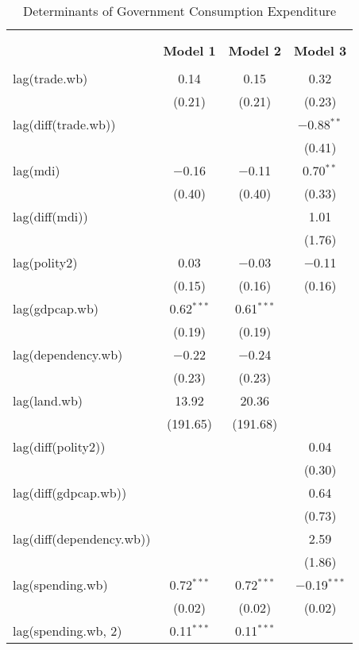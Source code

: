 
\begin{table}[!htbp] \centering 
  \caption{Determinants of Government Consumption Expenditure} 
  \label{} 
\footnotesize 
\begin{tabular}{@{\extracolsep{5pt}}lccc} 
\\[-1.8ex]\hline \\[-1.8ex] 
\\[-1.8ex] & \textbf{Model 1} & \textbf{Model 2} & \textbf{Model 3}\\ 
\hline \\[-1.8ex] 
 lag(trade.wb) & 0.14 & 0.15 & 0.32 \\ 
  & (0.21) & (0.21) & (0.23) \\ 
  lag(diff(trade.wb)) &  &  & $-$0.88$^{**}$ \\ 
  &  &  & (0.41) \\ 
  lag(mdi) & $-$0.16 & $-$0.11 & 0.70$^{**}$ \\ 
  & (0.40) & (0.40) & (0.33) \\ 
  lag(diff(mdi)) &  &  & 1.01 \\ 
  &  &  & (1.76) \\ 
  lag(polity2) & 0.03 & $-$0.03 & $-$0.11 \\ 
  & (0.15) & (0.16) & (0.16) \\ 
  lag(gdpcap.wb) & 0.62$^{***}$ & 0.61$^{***}$ &  \\ 
  & (0.19) & (0.19) &  \\ 
  lag(dependency.wb) & $-$0.22 & $-$0.24 &  \\ 
  & (0.23) & (0.23) &  \\ 
  lag(land.wb) & 13.92 & 20.36 &  \\ 
  & (191.65) & (191.68) &  \\ 
  lag(diff(polity2)) &  &  & 0.04 \\ 
  &  &  & (0.30) \\ 
  lag(diff(gdpcap.wb)) &  &  & 0.64 \\ 
  &  &  & (0.73) \\ 
  lag(diff(dependency.wb)) &  &  & 2.59 \\ 
  &  &  & (1.86) \\ 
  lag(spending.wb) & 0.72$^{***}$ & 0.72$^{***}$ & $-$0.19$^{***}$ \\ 
  & (0.02) & (0.02) & (0.02) \\ 
  lag(spending.wb, 2) & 0.11$^{***}$ & 0.11$^{***}$ &  \\ 

\end{tabular}
\end{table}
